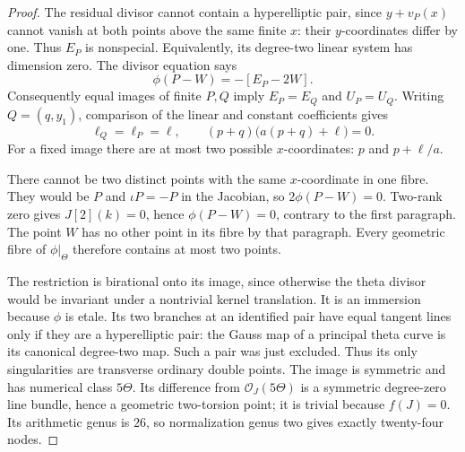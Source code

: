 \begin{proof}
The residual divisor cannot contain a hyperelliptic pair, since
$y+v_P(x)$ cannot vanish at both points above the same finite $x$:
their $y$-coordinates differ by one. Thus $E_P$ is nonspecial.
Equivalently, its degree-two linear system has dimension zero.
The divisor equation says
\[
                  \phi(P-W)=-[E_P-2W].
\]
Consequently equal images of finite $P,Q$ imply $E_P=E_Q$ and
$U_P=U_Q$. Writing $Q=(q,y_1)$, comparison of the linear and
constant coefficients gives
\[
 \ell_Q=\ell_P=\ell,\qquad
                 (p+q)\bigl(a(p+q)+\ell\bigr)=0.
\]
For a fixed image there are at most two possible $x$-coordinates:
$p$ and $p+\ell/a$.

There cannot be two distinct points with the same $x$-coordinate
in one fibre. They would be $P$ and $\iota P=-P$ in the Jacobian,
so $2\phi(P-W)=0$. Two-rank zero gives $J[2](k)=0$, hence
$\phi(P-W)=0$, contrary to the first paragraph. The point $W$
has no other point in its fibre by that paragraph. Every geometric
fibre of $\phi|_\Theta$ therefore contains at most two points.

The restriction is birational onto its image, since otherwise the
theta divisor would be invariant under a nontrivial kernel translation.
It is an immersion because $\phi$ is etale. Its two branches at an
identified pair have equal tangent lines only if they are a
hyperelliptic pair: the Gauss map of a principal theta curve is its
canonical degree-two map. Such a pair was just excluded. Thus its
only singularities are transverse ordinary double points.
The image is symmetric and has numerical class $5\Theta$.
Its difference from $\mathcal O_J(5\Theta)$ is a symmetric
degree-zero line bundle, hence a geometric two-torsion point;
it is trivial because $f(J)=0$. Its arithmetic genus is $26$,
so normalization genus two gives exactly twenty-four nodes.
\end{proof}

